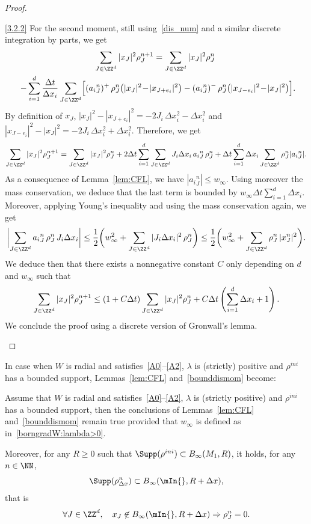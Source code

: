 \begin{proof}
\begin{laststep}{\eqref{3.2.2}}
For the second moment, still using~\eqref{dis_num} and a similar discrete integration by parts, we get
\begin{multline*}
\!\!\sum_{J\in \ZZ^d} |x_J|^2 \rho_{J}^{n+1} =  \sum_{J\in
\ZZ^d} |x_J|^2\rho_{J}^n\\ 
-  \sum_{i=1}^d \frac{\Delta t}{\Delta x_i} \sum_{J\in\ZZ^d} \Bigl[({a_i}^n_{J})^+ \, \rho_{J}^n \big(|x_J|^2\!-\!|x_{J+e_i}|^2\big) -({a_i}^n_{J})^- \, \rho_{J}^n \big(|x_{J-e_i}|^2\!-\!|x_{J}|^2\big)\Bigr].\!\!
\end{multline*}
By definition of $x_J$, $|x_J|^2-|x_{J+e_i}|^2=-2J_i\, \Delta x_i^2 - \Delta x_i^2$ and $|x_{J-e_i}|^2-|x_J|^2=-2J_i\, \Delta x_i^2 + \Delta x_i^2$. Therefore, we get
\[
\sum_{J\in \ZZ^d} |x_J|^2 \rho_{J}^{n+1} = \sum_{J\in \ZZ^d} |x_J|^2 \rho_{J}^{n} + 2\Delta t \sum_{i=1}^d\sum_{J\in \ZZ^d} J_i \Delta x_i \, {a_i}^n_{J} \, \rho_{J}^n + \Delta t\sum_{i=1}^d \Delta x_i \sum_{J\in \ZZ^d} \rho_{J}^n |{a_i}^n_{J}|.
\]
As a consequence of Lemma~\ref{lem:CFL}, we have $|{a_i}^n_{J}|\leq w_\infty$. Using moreover the mass conservation, we deduce that the last term is bounded by $w_\infty \Delta t \sum_{i=1}^d \Delta x_i$. Moreover, applying Young's inequality and using the mass conservation again, we get
\[
\mathopen\bigg|\sum_{J\in \ZZ^d} {a_i}^n_{J} \, \rho_{J}^n \, J_i \Delta x_{i} \mathclose\bigg| \leq
\frac{1}{2} \bigg(w_\infty^2 + \sum_{J\in \ZZ^d} |J_{i} \Delta x_i|^2 \, \rho_{J}^n \bigg)
\leq
\frac{1}{2} \bigg(w_\infty^2 + \sum_{J\in \ZZ^d} \rho_{J}^n
\, \vert x^n_{J} \vert^2\bigg).
\]
We deduce then that there exists a nonnegative constant $C$ only depending on $d$ and $w_\infty$ such that
\[
\sum_{J\in \ZZ^d} |x_J|^2 \rho_{J}^{n+1} \leq
(1+C\Delta t)\sum_{J\in \ZZ^d} |x_J|^2 \rho_{J}^{n} + C\Delta t\left(\sum_{i=1}^d\Delta x_i+1\right).
\]
We conclude the proof using a discrete version of Gronwall's lemma.
\end{laststep}
\let\qed\relax
\end{proof}

In case when $W$ is radial and satisfies~\eqref{A0}--\eqref{A2}, $\lambda$ is (strictly) positive and $\rho^{ini}$ has a bounded support, Lemmas~\ref{lem:CFL} and~\ref{bounddismom} become:

\begin{lemm}\label{lem:CFL:lambda:>0}
Assume that $W$ is radial and satisfies~\eqref{A0}--\eqref{A2}, $\lambda$ is (strictly positive) and $\rho^{ini}$ has a bounded support, then the conclusions of Lemmas~\ref{lem:CFL} and~\ref{bounddismom} remain true provided that $w_{\infty}$ is defined as in~\eqref{borngradW:lambda>0}.

Moreover, for any $R \geq 0$ such that $\Supp(\rho^{ini}) \subset B_{\infty}(M_{1},R)$, it holds, for any $n \in \NN$,
\begin{equation*}
\Supp(\rho^n_{\Delta x}) \subset B_{\infty}(\mIn{},R+\Delta x),
\end{equation*}
that is
\begin{equation*}
\forall J \in \ZZ^d, \quad x_{J} \not \in B_{\infty}(\mIn{},R+\Delta x)
\Rightarrow \rho^n_{J} = 0.
\end{equation*}
\end{lemm}

